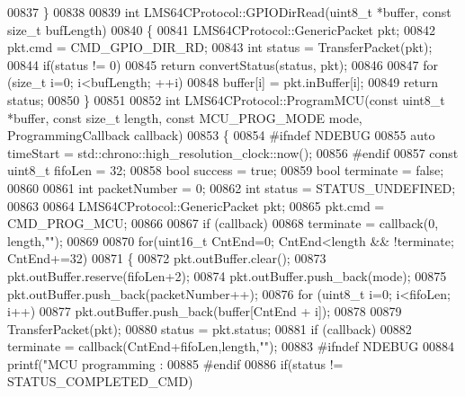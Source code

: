 \begin{DoxyCode}
{{{{{{{00837 \}
00838 
00839 \textcolor{keywordtype}{int} LMS64CProtocol::GPIODirRead(uint8\_t *buffer, \textcolor{keyword}{const} \textcolor{keywordtype}{size\_t} bufLength)
00840 \{
00841     LMS64CProtocol::GenericPacket pkt;
00842     pkt.cmd = CMD_GPIO_DIR_RD;
00843     \textcolor{keywordtype}{int} status = TransferPacket(pkt);
00844     \textcolor{keywordflow}{if}(status != 0)
00845         \textcolor{keywordflow}{return} convertStatus(status, pkt);
00846 
00847     \textcolor{keywordflow}{for} (\textcolor{keywordtype}{size\_t} i=0; i<bufLength; ++i)
00848         buffer[i] = pkt.inBuffer[i];
00849     \textcolor{keywordflow}{return} status;
00850 \}
00851 
00852 \textcolor{keywordtype}{int} LMS64CProtocol::ProgramMCU(\textcolor{keyword}{const} uint8\_t *buffer, \textcolor{keyword}{const} \textcolor{keywordtype}{size\_t} length, \textcolor{keyword}{const} 
      MCU_PROG_MODE mode, ProgrammingCallback callback)
00853 \{
00854 \textcolor{preprocessor}{#ifndef NDEBUG}
00855     \textcolor{keyword}{auto} timeStart = std::chrono::high\_resolution\_clock::now();
00856 \textcolor{preprocessor}{#endif}
00857     \textcolor{keyword}{const} uint8\_t fifoLen = 32;
00858     \textcolor{keywordtype}{bool} success = \textcolor{keyword}{true};
00859     \textcolor{keywordtype}{bool} terminate = \textcolor{keyword}{false};
00860 
00861     \textcolor{keywordtype}{int} packetNumber = 0;
00862     \textcolor{keywordtype}{int} status = STATUS_UNDEFINED;
00863 
00864     LMS64CProtocol::GenericPacket pkt;
00865     pkt.cmd = CMD_PROG_MCU;
00866 
00867     \textcolor{keywordflow}{if} (callback)
00868         terminate = callback(0, length,\textcolor{stringliteral}{""});
00869 
00870     \textcolor{keywordflow}{for}(uint16\_t CntEnd=0; CntEnd<length && !terminate; CntEnd+=32)
00871     \{
00872         pkt.outBuffer.clear();
00873         pkt.outBuffer.reserve(fifoLen+2);
00874         pkt.outBuffer.push\_back(mode);
00875         pkt.outBuffer.push\_back(packetNumber++);
00876         \textcolor{keywordflow}{for} (uint8\_t i=0; i<fifoLen; i++)
00877             pkt.outBuffer.push\_back(buffer[CntEnd + i]);
00878 
00879         TransferPacket(pkt);
00880         status = pkt.status;
00881         \textcolor{keywordflow}{if} (callback)
00882             terminate = callback(CntEnd+fifoLen,length,\textcolor{stringliteral}{""});
00883 \textcolor{preprocessor}{#ifndef NDEBUG}
00884         printf(\textcolor{stringliteral}{"MCU programming : %
00885 \textcolor{preprocessor}{#endif}
00886         \textcolor{keywordflow}{if}(status != STATUS_COMPLETED_CMD)
}}}}}}}}
\end{DoxyCode}
